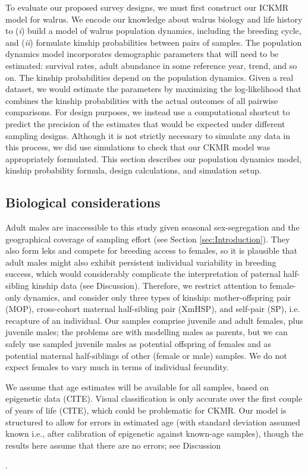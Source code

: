 To evaluate our proposed survey designs, we must first construct our
ICKMR model for walrus. We encode our knowledge about walrus biology
and life history to (\textit{i}) build a model of walrus population
dynamics, including the breeding cycle, and (\textit{ii}) formulate
kinship probabilities between pairs of samples. The population dynamics
model incorporates demographic parameters that will need to be estimated:
survival rates, adult abundance in some reference year, trend, and
so on. The kinship probabilities depend on the population dynamics.
Given a real dataset, we would estimate the parameters by maximizing
the log-likelihood that combines the kinship probabilities with the
actual outcomes of all pairwise comparisons. For design purposes,
we instead use a computational shortcut to predict the precision of
the estimates that would be expected under different sampling designs.
Although it is not strictly necessary to simulate any data in this
process, we did use simulations to check that our CKMR model was appropriately
formulated. This section describes our population dynamics model,
kinship probability formula, design calculations, and simulation setup.

\subsection{Biological considerations}

Adult males are inaccessible to this study given seasonal sex-segregation
and the geographical coverage of sampling effort (see Section \ref{sec:Introduction}).
They also form leks and compete for breeding access to females, so
it is plausible that adult males might also exhibit persistent individual
variability in breeding success, which would considerably complicate
the interpretation of paternal half-sibling kinship data (see Discussion).
Therefore, we restrict attention to female-only dynamics, and consider
only three types of kinship: mother-offspring pair (MOP), cross-cohort
maternal half-sibling pair (XmHSP), and self-pair (SP), i.e. recapture
of an individual. Our samples comprise juvenile and adult females,
plus juvenile males; the problems are with modelling males as parents,
but we can safely use sampled juvenile males as potential offspring
of females and as potential maternal half-siblings of other (female
or male) samples. We do not expect females to vary much in terms of
individual fecundity.

We assume that age estimates will be available for all samples, based
on epigenetic data (CITE). Visual classification is only accurate
over the first couple of years of life (CITE), which could be problematic
for CKMR. Our model is structured to allow for errors in estimated
age (with standard deviation assumed known i.e., after calibration
of epigenetic against known-age samples), though the results here
assume that there are no errors; see Discussion%
\begin{comment}
Can we put Mark's section on age error in an appendix and reference
it here?
\end{comment}
.

